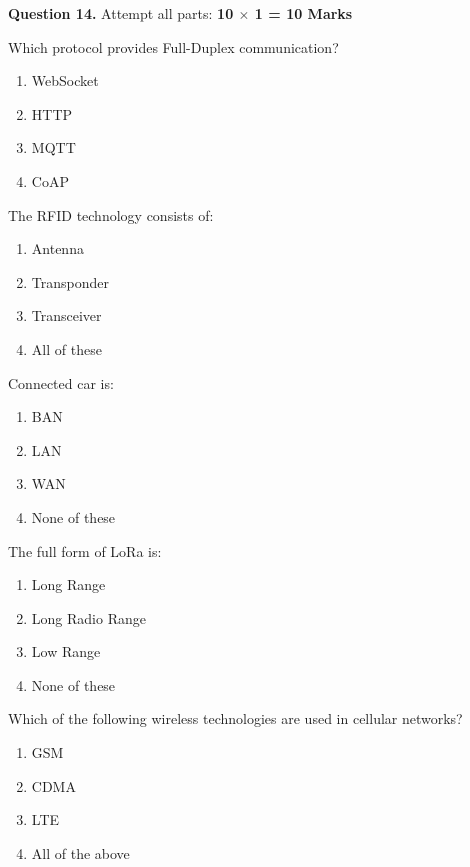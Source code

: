 \documentclass[11pt,a4paper]{article}
\begin{document}
\noindent   \textbf{Question 14.} Attempt all parts: \hfill   \textbf{10 $ \times$ 1 = 10 Marks}

\begin{parts}
  \item Which protocol provides Full-Duplex communication?
  
\begin{enumerate}[label=(\alph*)]
    \item WebSocket
    \item HTTP
    \item MQTT
    \item CoAP
  \end{enumerate}
  
  \item The RFID technology consists of:
  
\begin{enumerate}[label=(\alph*)]
    \item Antenna
    \item Transponder
    \item Transceiver
    \item All of these
  \end{enumerate}
  
  \item Connected car is:
  
\begin{enumerate}[label=(\alph*)]
    \item BAN
    \item LAN
    \item WAN
    \item None of these
  \end{enumerate}
  
  \item The full form of LoRa is:
  
\begin{enumerate}[label=(\alph*)]
    \item Long Range
    \item Long Radio Range
    \item Low Range
    \item None of these
  \end{enumerate}
  
  \item Which of the following wireless technologies are used in cellular networks?
  
\begin{enumerate}[label=(\alph*)]
    \item GSM
    \item CDMA
    \item LTE
    \item All of the above
  \end{enumerate}
  

\end{parts}
\end{document}
